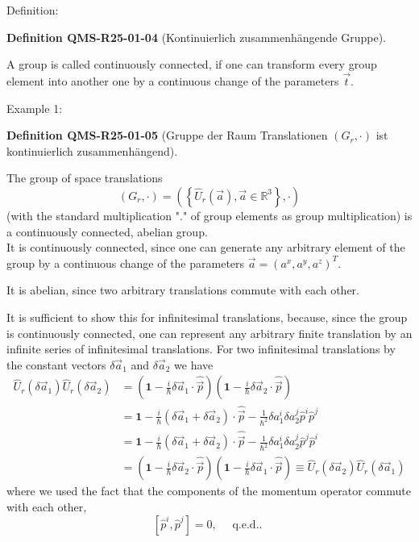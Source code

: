 \documentclass[10pt, letterpaper]{article}
\newcommand{\CustomHeading}[3]{%
  \par\medskip\noindent%
  \textbf{#1 #2} \textnormal{(#3)}.\enskip%
}
\newenvironment{DEF}[2]{\begin{unitbox}\CustomHeading{Definition}{#1}{#2}}{\end{unitbox}}
\begin{document}
Definition: 

\begin{DEF}{QMS-R25-01-04}{Kontinuierlich zusammenhängende Gruppe}
A group is called continuously connected, if one can transform every group element into another one by a continuous change of the parameters $\vec{t}$.
\end{DEF}


Example 1: 

\begin{DEF}{QMS-R25-01-05}{Gruppe der Raum Translationen $(G_{r}, \cdot)$ ist kontinuierlich zusammenhängend}
The group of space translations
$$
\left(G_{r}, \cdot\right)=\left(\left\{\hat{U}_{r}(\vec{a}), \vec{a} \in \mathbb{R}^{3}\right\}, \cdot\right)
$$
(with the standard multiplication "." of group elements as group multiplication) is a continuously connected, abelian group.\\
It is continuously connected, since one can generate any arbitrary element of the group by a continuous change of the parameters $\vec{a}=\left(a^{x}, a^{y}, a^{z}\right)^{T}$.

It is abelian, since two arbitrary translations commute with each other. 

It is sufficient to show this for infinitesimal translations, because, since the group is continuously connected, one can represent any arbitrary finite translation by an infinite series of infinitesimal translations. For two infinitesimal translations by the constant vectors $\delta \vec{a}_{1}$ and $\delta \vec{a}_{2}$ we have
$$
\begin{aligned}
\hat{U}_{r}\left(\delta \vec{a}_{1}\right) \hat{U}_{r}\left(\delta \vec{a}_{2}\right) & =\left(\mathbf{1}-\frac{i}{\hbar} \delta \vec{a}_{1} \cdot \hat{\vec{p}}\right)\left(\mathbf{1}-\frac{i}{\hbar} \delta \vec{a}_{2} \cdot \hat{\vec{p}}\right) \\
& =\mathbf{1}-\frac{i}{\hbar}\left(\delta \vec{a}_{1}+\delta \vec{a}_{2}\right) \cdot \hat{\vec{p}}-\frac{1}{\hbar^{2}} \delta a_{1}^{i} \delta a_{2}^{j} \hat{p}^{i} \hat{p}^{j} \\
& =\mathbf{1}-\frac{i}{\hbar}\left(\delta \vec{a}_{1}+\delta \vec{a}_{2}\right) \cdot \hat{\vec{p}}-\frac{1}{\hbar^{2}} \delta a_{1}^{i} \delta a_{2}^{j} \hat{p}^{j} \hat{p}^{i} \\
& =\left(\mathbf{1}-\frac{i}{\hbar} \delta \vec{a}_{2} \cdot \hat{\vec{p}}\right)\left(\mathbf{1}-\frac{i}{\hbar} \delta \vec{a}_{1} \cdot \hat{\vec{p}}\right) \equiv \hat{U}_{r}\left(\delta \vec{a}_{2}\right) \hat{U}_{r}\left(\delta \vec{a}_{1}\right)
\end{aligned}
$$
where we used the fact that the components of the momentum operator commute with each other,
$$
\left[\hat{p}^{i}, \hat{p}^{j}\right]=0, \quad \text { q.e.d.. }
$$
\end{DEF}
\end{document}
